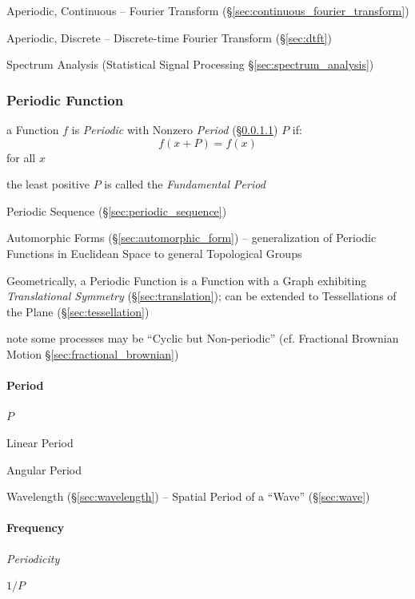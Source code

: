 Aperiodic, Continuous -- Fourier Transform
  (\S\ref{sec:continuous_fourier_transform})

Aperiodic, Discrete -- Discrete-time Fourier Transform (\S\ref{sec:dtft})

\fist Spectrum Analysis (Statistical Signal Processing
\S\ref{sec:spectrum_analysis})



\subsubsection{Periodic Function}\label{sec:periodic_function}

a Function $f$ is \emph{Periodic} with Nonzero \emph{Period}
(\S\ref{sec:period}) $P$ if:
\[
  f(x+P) = f(x)
\]
for all $x$

the least positive $P$ is called the \emph{Fundamental Period}

\fist Periodic Sequence (\S\ref{sec:periodic_sequence})

\fist Automorphic Forms (\S\ref{sec:automorphic_form}) -- generalization of
Periodic Functions in Euclidean Space to general Topological Groups

Geometrically, a Periodic Function is a Function with a Graph exhibiting
\emph{Translational Symmetry} (\S\ref{sec:translation});
can be extended to Tessellations of the Plane (\S\ref{sec:tessellation})

note some processes may be ``Cyclic but Non-periodic'' (cf. Fractional Brownian
Motion \S\ref{sec:fractional_brownian})



\paragraph{Period}\label{sec:period}\hfill

$P$

Linear Period

Angular Period

Wavelength (\S\ref{sec:wavelength}) -- Spatial Period of a ``Wave''
(\S\ref{sec:wave})



\paragraph{Frequency}\label{sec:frequency}\hfill

\emph{Periodicity}

$1 / P$

